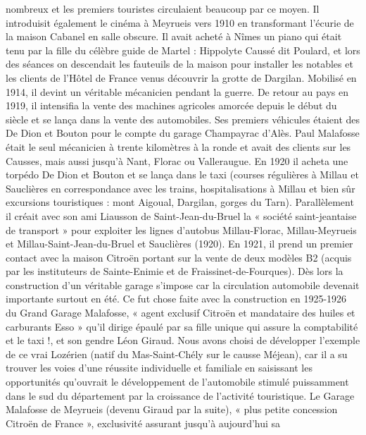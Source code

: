 
nombreux et les premiers touristes circulaient beaucoup par ce moyen. Il introduisit également
le cinéma à Meyrueis vers 1910 en transformant l’écurie de la maison Cabanel en salle
obscure. Il avait acheté à Nîmes un piano qui était tenu par la fille du célèbre guide de Martel :
Hippolyte Caussé dit Poulard, et lors des séances on descendait les fauteuils de la maison pour
installer les notables et les clients de l’Hôtel de France venus découvrir la grotte de Dargilan.
Mobilisé en 1914, il devint un véritable mécanicien pendant la guerre. De retour au pays en 1919,
il intensifia la vente des machines agricoles amorcée depuis le début du siècle et se lança dans
la vente des automobiles. Ses premiers véhicules étaient des De Dion et Bouton pour le compte
du garage Champayrac d’Alès. Paul Malafosse était le seul mécanicien à trente kilomètres à la
ronde et avait des clients sur les Causses, mais aussi jusqu’à Nant, Florac ou Valleraugue. En 1920
il acheta une torpédo De Dion et Bouton et se lança dans le taxi (courses régulières à Millau et
Sauclières en correspondance avec les trains, hospitalisations à Millau et bien sûr excursions
touristiques : mont Aigoual, Dargilan, gorges du Tarn). Parallèlement il créait avec son ami
Liausson de Saint-Jean-du-Bruel la « société saint-jeantaise de transport » pour exploiter les
lignes d’autobus Millau-Florac, Millau-Meyrueis et Millau-Saint-Jean-du-Bruel et Sauclières
(1920). En 1921, il prend un premier contact avec la maison Citroën portant sur la vente de deux
modèles B2 (acquis par les instituteurs de Sainte-Enimie et de Fraissinet-de-Fourques). Dès lors la
construction d’un véritable garage s’impose car la circulation automobile devenait importante
surtout en été. Ce fut chose faite avec la construction en 1925-1926 du Grand Garage Malafosse,
« agent exclusif Citroën et mandataire des huiles et carburants Esso » qu’il dirige épaulé par sa
fille unique qui assure la comptabilité et le taxi !, et son gendre Léon Giraud. Nous avons choisi
de développer l’exemple de ce vrai Lozérien (natif du Mas-Saint-Chély sur le causse Méjean), car
il a su trouver les voies d’une réussite individuelle et familiale en saisissant les opportunités
qu’ouvrait le développement de l’automobile stimulé puissamment dans le sud du département
par la croissance de l’activité touristique. Le Garage Malafosse de Meyrueis (devenu Giraud par la
suite), « plus petite concession Citroën de France », exclusivité assurant jusqu’à aujourd’hui sa
